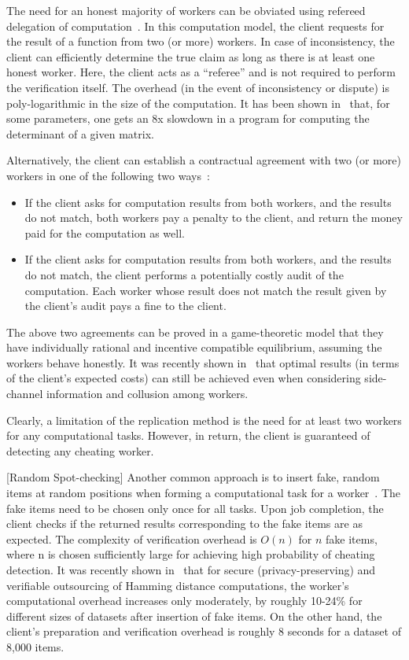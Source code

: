 The need for an honest majority of workers can be obviated using refereed delegation of computation~\cite{CRR11}. In this computation model, the client requests for the result of a function from two (or more) workers. In case of inconsistency, the client can efficiently determine the true claim as long as there is at least one honest worker. Here, the client acts as a ``referee'' and is not required to perform the verification itself. The overhead (in the event of inconsistency or dispute) is poly-logarithmic in the size of the computation. It has been shown in~\cite{CRR11} that, for some parameters, one gets an 8x slowdown in a program for computing the determinant of a given matrix.

Alternatively, the client can establish a contractual agreement with two (or more) workers in one of the following two ways~\cite{NK12}:
\begin{itemize}
 \item If the client asks for computation results from both workers, and the results do not match, both workers pay a penalty to the client, and return the money paid for the computation as well.
 \item If the client asks for computation results from both workers, and the results do not match, the client performs a potentially costly audit of the computation. Each worker whose result does not match the result given by the client's audit pays a fine to the client.
\end{itemize}
The above two agreements can be proved in a game-theoretic model that they have individually rational and incentive compatible equilibrium, assuming the workers behave honestly. 
It was recently shown in~\cite{CKP14} that optimal results (in terms of the client's expected costs) can still be achieved even when considering side-channel information and collusion among workers.

Clearly, a limitation of the replication method is the need for at least two workers for any computational tasks. However, in return, the client is guaranteed of detecting any cheating worker.

[Random Spot-checking]
Another common approach is to insert fake, random items at random positions when forming a computational task for a worker~\cite{GM01,JK07}. The fake items need to be chosen only once for all tasks. Upon job completion, the client checks if the returned results corresponding to the fake items are as expected. The complexity of verification overhead is $O(n)$ for $n$ fake items, where n is chosen sufficiently large for achieving high probability of cheating detection. It was recently shown in~\cite{BZF13} that for secure (privacy-preserving) and verifiable outsourcing of Hamming distance computations, the worker's computational overhead increases only moderately, by roughly 10-24\% for different sizes of datasets after insertion of fake items. On the other hand, the client's preparation and verification overhead is roughly 8 seconds for a dataset of 8,000 items.


